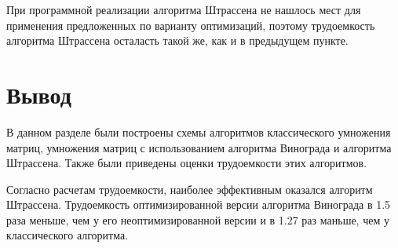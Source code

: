 При программной реализации алгоритма Штрассена не нашлось мест для применения предложенных по варианту оптимизаций, поэтому трудоемкость алгоритма Штрассена осталасть такой же, как и в предыдущем пункте.

\section*{Вывод}

В данном разделе были построены схемы алгоритмов классического умножения матриц, умножения матриц с использованием алгоритма Винограда и алгоритма Штрассена. Также были приведены оценки трудоемкости этих алгоритмов.

Согласно расчетам трудоемкости, наиболее эффективным оказался алгоритм Штрассена. Трудоемкость оптимизированной версии алгоритма Винограда в 1.5 раза меньше, чем у его неоптимизированной версии и в 1.27 раз маньше, чем у классического алгоритма. 

